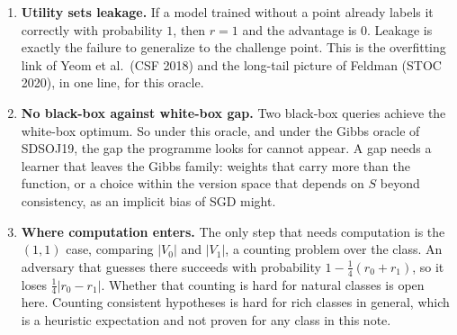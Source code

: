 \documentclass[
]{article}
\providecommand{\tightlist}{%
  \setlength{\itemsep}{0pt}\setlength{\parskip}{0pt}}
\begin{document}
\begin{enumerate}
\def\labelenumi{\arabic{enumi}.}
\tightlist
\item
  \textbf{Utility sets leakage.} If a model trained without a point
  already labels it correctly with probability \(1\), then \(r = 1\) and
  the advantage is \(0\). Leakage is exactly the failure to generalize
  to the challenge point. This is the overfitting link of Yeom et
  al.~(CSF 2018) and the long-tail picture of Feldman (STOC 2020), in
  one line, for this oracle.
\item
  \textbf{No black-box against white-box gap.} Two black-box queries
  achieve the white-box optimum. So under this oracle, and under the
  Gibbs oracle of SDSOJ19, the gap the programme looks for cannot
  appear. A gap needs a learner that leaves the Gibbs family: weights
  that carry more than the function, or a choice within the version
  space that depends on \(S\) beyond consistency, as an implicit bias of
  SGD might.
\item
  \textbf{Where computation enters.} The only step that needs
  computation is the \((1,1)\) case, comparing \(|V_0|\) and \(|V_1|\),
  a counting problem over the class. An adversary that guesses there
  succeeds with probability \(1 - \tfrac14(r_0 + r_1)\), so it loses
  \(\tfrac14|r_0 - r_1|\). Whether that counting is hard for natural
  classes is open here. Counting consistent hypotheses is hard for rich
  classes in general, which is a heuristic expectation and not proven
  for any class in this note.
\end{enumerate}
\end{document}
